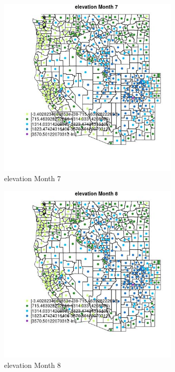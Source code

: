 \begin{figure} 
\centering  
\includegraphics[width=0.77\textwidth]{Code_Outputs/df_report_ML_predictors_CountyCentroid_Locations_Dates_2008-01-01to2018-12-31_MapObsMo7elevation.jpg} 
\caption{\label{fig:df_report_ML_predictors_CountyCentroid_Locations_Dates_2008-01-01to2018-12-31MapObsMo7elevation}elevation Month 7} 
\end{figure} 
 

\clearpage 

\begin{figure} 
\centering  
\includegraphics[width=0.77\textwidth]{Code_Outputs/df_report_ML_predictors_CountyCentroid_Locations_Dates_2008-01-01to2018-12-31_MapObsMo8elevation.jpg} 
\caption{\label{fig:df_report_ML_predictors_CountyCentroid_Locations_Dates_2008-01-01to2018-12-31MapObsMo8elevation}elevation Month 8} 
\end{figure} 
 


